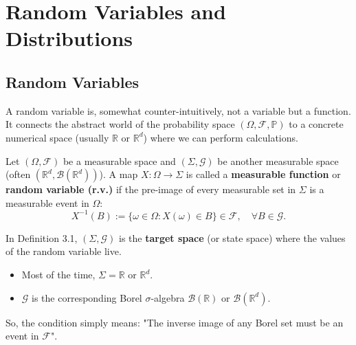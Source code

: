 \chapter{Random Variables and Distributions}

\section{Random Variables}

A random variable is, somewhat counter-intuitively, not a variable but a function. It connects the abstract world of the probability space $(\Omega, \mathcal{F}, \mathbb{P})$ to a concrete numerical space (usually $\mathbb{R}$ or $\mathbb{R}^d$) where we can perform calculations.

\begin{definition}
Let $(\Omega, \mathcal{F})$ be a measurable space and $(\Sigma, \mathcal{G})$ be another measurable space (often $(\mathbb{R}^d, \mathcal{B}(\mathbb{R}^d))$). A map $X: \Omega \to \Sigma$ is called a \textbf{measurable function} or \textbf{random variable (r.v.)} if the pre-image of every measurable set in $\Sigma$ is a measurable event in $\Omega$:
\[
X^{-1}(B) := \{ \omega \in \Omega : X(\omega) \in B \} \in \mathcal{F}, \quad \forall B \in \mathcal{G}.
\]
\end{definition}

\begin{remark}[Notation]
In Definition 3.1, $(\Sigma, \mathcal{G})$ is the \textbf{target space} (or state space) where the values of the random variable live.
\begin{itemize}
    \item Most of the time, $\Sigma = \mathbb{R}$ or $\mathbb{R}^d$.
    \item $\mathcal{G}$ is the corresponding Borel $\sigma$-algebra $\mathcal{B}(\mathbb{R})$ or $\mathcal{B}(\mathbb{R}^d)$.
\end{itemize}
So, the condition simply means: "The inverse image of any Borel set must be an event in $\mathcal{F}$".
\end{remark}


